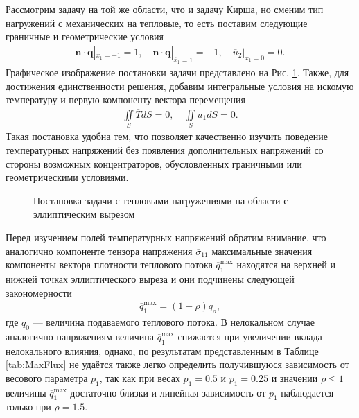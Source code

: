Рассмотрим задачу на той же области, что и задачу Кирша, но сменим тип нагружений с механических на тепловые, то есть поставим следующие граничные и геометрические условия
\begin{gather*}
	\boldsymbol{n} \cdot \overline{\boldsymbol{q}}|_{\overline{x}_1 = -1} = 1,
	\quad
	\boldsymbol{n} \cdot \overline{\boldsymbol{q}}|_{\overline{x}_1 = 1} = -1,
	\quad
	\overline{u}_2 |_{\overline{x}_1 = 0} = 0.
\end{gather*}
Графическое изображение постановки задачи представлено на Рис. \ref{fig:ThermalKirshProblem}. Также, для достижения единственности решения, добавим интегральные условия на искомую температуру и первую компоненту вектора перемещения
\begin{gather*}
	\iint\limits_S \overline{T} dS = 0,
	\quad
	\iint\limits_S \overline{u}_1 dS = 0.
\end{gather*}
Такая постановка удобна тем, что позволяет качественно изучить поведение температурных напряжений без появления дополнительных напряжений со стороны возможных концентраторов, обусловленных граничными или геометрическими условиями.

\begin{figure}[ht]
    \caption{Постановка задачи с тепловыми нагружениями на области с эллиптическим вырезом}
    \label{fig:ThermalKirshProblem}
\end{figure}

Перед изучением полей температурных напряжений обратим внимание, что аналогично компоненте тензора напряжения $\overline{\sigma}_{11}$ максимальные значения компоненты вектора плотности теплового потока $\overline{q}_1^{\max}$ находятся на верхней и нижней точках эллиптического выреза и они подчинены следующей закономерности
\begin{gather*}
	\overline{q}_1^{\max} = (1 + \rho) q_o,
\end{gather*}
где $q_0$ --- величина подаваемого теплового потока. В нелокальном случае аналогично напряжениям величина $\overline{q}_1^{\max}$ снижается при увеличении вклада нелокального влияния, однако, по результатам представленным в Таблице \ref{tab:MaxFlux} не удаётся также легко определить получившуюся зависимость от весового параметра $p_1$, так как при весах $p_1 = 0.5$ и $p_1 = 0.25$ и значении $\rho \leqslant 1$ величины $\overline{q}_1^{\max}$ достаточно близки и линейная зависимость от $p_1$ наблюдается только при $\rho = 1.5$.

